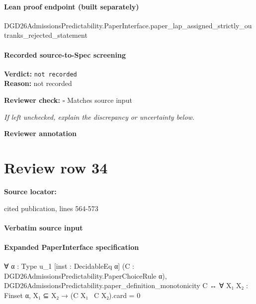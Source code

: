 \documentclass[10pt]{article}
\newcommand{\reviewerbox}{%
  \par\noindent\fbox{\parbox{0.96\linewidth}{\rule{0pt}{0.38in}}}\par
}
\newcommand{\reviewmatch}[1]{%
  \par\noindent\textbf{Reviewer check:} $\square$\; #1\par
  \noindent\emph{If left unchecked, explain the discrepancy or uncertainty below.}\par
}
\begin{document}
\paragraph{Lean proof endpoint (built separately)}\begin{ReviewVerbatim}
DGD26AdmissionsPredictability.PaperInterface.paper_lap_assigned_strictly_outranks_rejected_statement
\end{ReviewVerbatim}

\paragraph{Recorded source-to-Spec screening}
\textbf{Verdict:} \texttt{not recorded}
\\
\textbf{Reason:} not recorded
\reviewmatch{Matches source input}
\noindent\textbf{Reviewer annotation}\par
\reviewerbox
\clearpage
\hypertarget{source-claim-14ff35045a22028c}{}
\section*{Review row 34}
\textbf{Source locator:} {\footnotesize\raggedright cited publication, lines 564-\allowbreak{}573\par}
\paragraph{Verbatim source input}


\paragraph{Expanded PaperInterface specification}
\begin{ReviewVerbatim}
∀ {α : Type u_1} [inst : DecidableEq α] (C : DGD26AdmissionsPredictability.PaperChoiceRule α),
  DGD26AdmissionsPredictability.paper_definition_monotonicity C ↔ ∀ {X₁ X₂ : Finset α}, X₁ ⊆ X₂ → (C X₁ \ C X₂).card = 0
\end{ReviewVerbatim}
\end{document}
